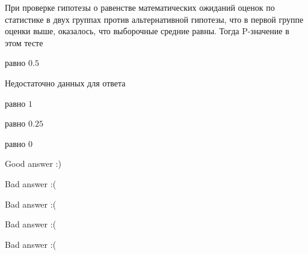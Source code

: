 
\begin{question}
При проверке гипотезы о равенстве математических ожиданий оценок по
статистике в двух группах против альтернативной гипотезы, что в первой
группе оценки выше, оказалось, что выборочные средние равны. Тогда
P-значение в этом тесте
\begin{answerlist}
  \item равно \(0.5\)
  \item Недостаточно данных для ответа
  \item равно \(1\)
  \item равно \(0.25\)
  \item равно \(0\)
\end{answerlist}
\end{question}

\begin{solution}
\begin{answerlist}
  \item Good answer :)
  \item Bad answer :(
  \item Bad answer :(
  \item Bad answer :(
  \item Bad answer :(
\end{answerlist}
\end{solution}

